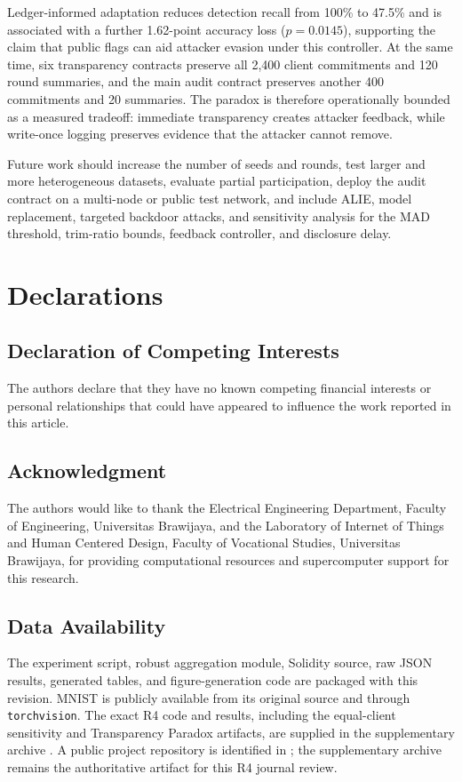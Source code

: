 \documentclass[10pt,letterpaper]{article}
\begin{document}
Ledger-informed adaptation reduces detection recall from 100\% to 47.5\% and is
associated with a further 1.62-point accuracy loss ($p=0.0145$), supporting the
claim that public flags can aid attacker evasion under this controller. At the
same time, six transparency contracts preserve all 2,400 client commitments and
120 round summaries, and the main audit contract preserves another 400
commitments and 20 summaries. The paradox is therefore operationally bounded as
a measured tradeoff: immediate transparency creates attacker feedback, while
write-once logging preserves evidence that the attacker cannot remove.

Future work should increase the number of seeds and rounds, test larger and
more heterogeneous datasets, evaluate partial participation, deploy the audit
contract on a multi-node or public test network, and include ALIE, model
replacement, targeted backdoor attacks, and sensitivity analysis for the MAD
threshold, trim-ratio bounds, feedback controller, and disclosure delay.

\section*{Declarations}

\subsection*{Declaration of Competing Interests}

The authors declare that they have no known competing financial interests or
personal relationships that could have appeared to influence the work reported
in this article.

\subsection*{Acknowledgment}

The authors would like to thank the Electrical Engineering Department, Faculty
of Engineering, Universitas Brawijaya, and the Laboratory of Internet of Things
and Human Centered Design, Faculty of Vocational Studies, Universitas Brawijaya,
for providing computational resources and supercomputer support for this
research.

\subsection*{Data Availability}

The experiment script, robust aggregation module, Solidity source, raw JSON
results, generated tables, and figure-generation code are packaged with this
revision. MNIST is publicly available from its original source and through
\texttt{torchvision}. The exact R4 code and results, including the equal-client
sensitivity and Transparency Paradox artifacts, are supplied in the
supplementary archive
. A public project repository is
identified in \cite{repository2026}; the supplementary archive remains the
authoritative artifact for this R4 journal review.
\end{document}
